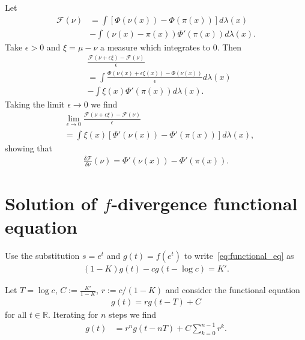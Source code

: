 \documentclass{article}
\newcommand{\cF}{\mathcal F}
\newcommand{\R}{\mathbb R}
\begin{document}
Let
\begin{align*}
\cF(\nu)&=\int [\Phi(\nu(x))-\Phi(\pi(x))]d\lambda(x)\\
    &-\int (\nu(x)-\pi(x))\Phi'(\pi(x))d\lambda(x).
\end{align*}
Take $\epsilon>0$ and $\xi = \mu-\nu$ a measure which integrates to 0. Then
\begin{align*}
    &\frac{\cF(\nu+\epsilon  \xi) -\cF(\nu)}{\epsilon}\\
    &= \int \frac{\Phi(\nu(x)+\epsilon  \xi(x))-\Phi(\nu(x))}{\epsilon}d\lambda(x)\\
    &-\int  \xi(x)\Phi'(\pi(x))d\lambda(x).
\end{align*}
Taking the limit $\epsilon\to 0$ we find
\begin{align*}
    &\lim_{\epsilon\to 0}\frac{\cF(\nu+\epsilon  \xi) -\cF(\nu)}{\epsilon}\\
    &= \int  \xi(x)[\Phi'(\nu(x))-\Phi'(\pi(x))]d\lambda(x),
\end{align*}
showing that 
\begin{align*}
    \frac{\delta \cF}{\delta \nu}(\nu)= \Phi'(\nu(x)) - \Phi'(\pi(x)).
\end{align*}

\section{Solution of $f$-divergence functional equation}
\label{sec:functional_eq}
Use the substitution $s=e^t$ and $g(t)=f(e^t)$ to write~\eqref{eq:functional_eq} as
\begin{align*}
(1-K) g(t) - cg(t-\log c) = K'.
\end{align*}

Let $T=\log c$, $C:=\frac{K'}{1-K}$, $r:=c/(1-K)$ and
consider the functional equation
\begin{align*}
g(t)=r g(t-T)+C
\end{align*}
for all $t\in \R$.
Iterating
for $n$ steps we find
\begin{align}
\label{eq:nonhomogeneous}
g(t)&=r^n g(t-nT)+C\sum_{k=0}^{n-1} r^k.
\end{align}
\end{document}
